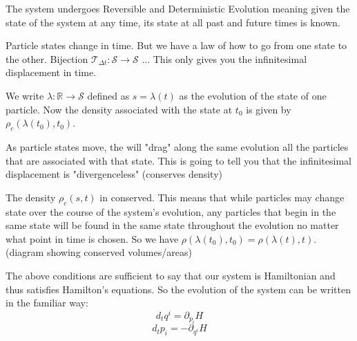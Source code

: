 \documentclass{article}
\begin{document}
\begin{assump}
	The system undergoes Reversible and Deterministic Evolution meaning given the state of the system at any time, its state at all past and future times is known.
\end{assump}

Particle states change in time. But we have a law of how to go from one state to the other. Bijection $\mathcal{T}_{\Delta t} : \mathcal{S} \to \mathcal{S}$ ... This only gives you the infinitesimal displacement in time.

\begin{defn}
	We write $\lambda: \mathbb{R} \rightarrow \mathcal{S}$ defined as $s = \lambda(t)$ as the evolution of the state of one particle. Now the density associated with the state at $t_0$ is given by $\rho_c(\lambda(t_0),t_0)$.
\end{defn}

	
As particle states move, the will "drag" along the same evolution all the particles that are associated with that state. This is going to tell you that the infinitesimal displacement is "divergenceless" (conserves density)

\begin{prop}
	The density $\rho_c(s,t)$ in conserved. This means that while particles may change state over the course of the system's evolution, any particles that begin in the same state will be found in the same state throughout the evolution no matter what point in time is chosen. So we have $\rho(\lambda(t_0),t_0) = \rho(\lambda(t),t)$. (diagram showing conserved volumes/areas)
\end{prop}

\begin{prop}
	The above conditions are sufficient to say that our system is Hamiltonian and thus satisfies Hamilton's equations. So the evolution of the system can be written in the familiar way:
	$$d_tq^i = \partial_{p_i}H$$
	$$d_tp_i = -\partial_{q^i}H$$
\end{prop} 
	
\end{document}
